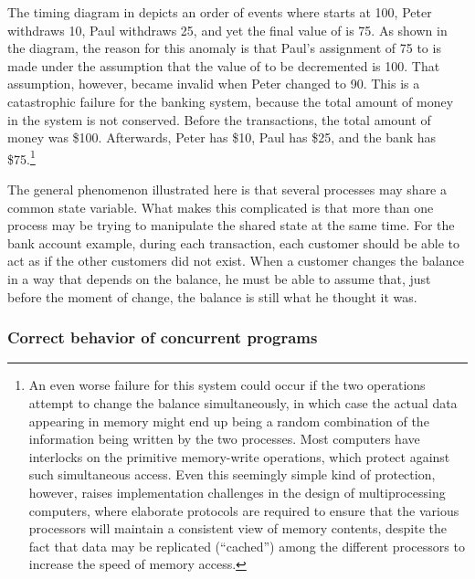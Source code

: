 The timing diagram in  depicts an order of events where
 starts at 100, Peter withdraws 10, Paul withdraws 25, and yet
the final value of  is 75.  As shown in the diagram, the reason
for this anomaly is that Paul's assignment of 75 to  is made
under the assumption that the value of  to be decremented is 100.
That assumption, however, became invalid when Peter changed  to
90.  This is a catastrophic failure for the banking system, because the total
amount of money in the system is not conserved.  Before the transactions, the
total amount of money was \$100.  Afterwards, Peter has \$10, Paul has \$25, and
the bank has \$75.\footnote{An even worse failure for this system could occur if
the two  operations attempt to change the balance simultaneously, in
which case the actual data appearing in memory might end up being a random
combination of the information being written by the two processes.  Most
computers have interlocks on the primitive memory-write operations, which
protect against such simultaneous access.  Even this seemingly simple kind of
protection, however, raises implementation challenges in the design of
multiprocessing computers, where elaborate  protocols
are required to ensure that the various processors will maintain a consistent
view of memory contents, despite the fact that data may be replicated
(``cached'') among the different processors to increase the speed of memory
access.}

The general phenomenon illustrated here is that several processes may share a
common state variable.  What makes this complicated is that more than one
process may be trying to manipulate the shared state at the same time.  For the
bank account example, during each transaction, each customer should be able to
act as if the other customers did not exist.  When a customer changes the
balance in a way that depends on the balance, he must be able to assume that,
just before the moment of change, the balance is still what he thought it was.

\subsubsection*{Correct behavior of concurrent programs}


